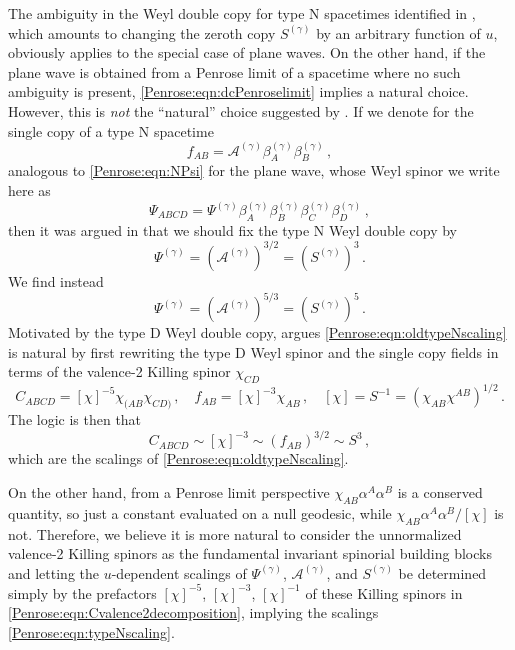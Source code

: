 The ambiguity in the Weyl double copy for type N spacetimes identified in \cite{Luna:2018dpt}, which amounts to changing the zeroth copy $S^{(\gamma)}$ by an arbitrary function of $u$, obviously applies to the special case of plane waves. On the other hand, if the plane wave is obtained from a Penrose limit of a spacetime where no such ambiguity is present, \eqref{Penrose:eqn:dcPenroselimit} implies a natural choice. However, this is \emph{not} the ``natural'' choice suggested by \cite{Luna:2018dpt}. If we denote for the single copy of a type N spacetime
\begin{equation}
	f_{AB} = \mathcal{A}^{(\gamma)}\beta^{(\gamma)}_A \beta^{(\gamma)}_B \, ,
\end{equation}
analogous to \eqref{Penrose:eqn:NPsi} for the plane wave, whose Weyl spinor we write here as
\begin{equation}
\Psi_{ABCD} = \Psi^{(\gamma)}  \beta^{(\gamma)}_A \beta^{(\gamma)}_B \beta^{(\gamma)}_C \beta^{(\gamma)}_D \, ,
\end{equation}
then  it was argued in \cite{Luna:2018dpt} that we should fix the type N Weyl double copy by
\begin{equation}\label{Penrose:eqn:oldtypeNscaling}
\Psi^{(\gamma)} = \left(\mathcal{A}^{(\gamma)}\right)^{3/2} = (S^{(\gamma)})^3 \, .
\end{equation}
We find instead
\begin{equation}\label{Penrose:eqn:typeNscaling}
\Psi^{(\gamma)} = \left(\mathcal{A}^{(\gamma)}\right)^{5/3} = (S^{(\gamma)})^5 \, .
\end{equation}
Motivated by the type D Weyl double copy, \cite{Luna:2018dpt} argues \eqref{Penrose:eqn:oldtypeNscaling} is natural by first rewriting the type D Weyl spinor and the single copy fields in terms of the valence-2 Killing spinor $\chi_{CD}$ 
\begin{equation}\label{Penrose:eqn:Cvalence2decomposition}
C_{ABCD} = [\chi]^{-5} \chi_{(AB} \chi_{CD)} \, , \quad  f_{AB} = [\chi]^{-3}  \chi_{AB} \, ,\quad [\chi] = S^{-1} = (\chi_{AB}\chi^{AB})^{1/2} \, .
\end{equation}
The logic is then that
\begin{equation}
C_{ABCD} \sim [\chi]^{-3} \sim  (f_{AB})^{3/2} \sim S^3 \, ,
\end{equation}
which are the scalings of \eqref{Penrose:eqn:oldtypeNscaling}.

On the other hand, from a Penrose limit perspective $\chi_{AB}\alpha^A \alpha^B$ is a conserved quantity, so just a constant evaluated on a null geodesic, while $\chi_{AB}\alpha^A \alpha^B/[\chi]$ is not. Therefore, we believe it is more natural to consider the unnormalized valence-2 Killing spinors as the fundamental invariant spinorial building blocks and letting the $u$-dependent scalings of $\Psi^{(\gamma)}$, $\mathcal{A}^{(\gamma)}$, and $S^{(\gamma)}$ be determined simply by the prefactors $[\chi]^{-5}$, $[\chi]^{-3}$, $[\chi]^{-1}$ of these Killing spinors in \eqref{Penrose:eqn:Cvalence2decomposition}, implying the scalings \eqref{Penrose:eqn:typeNscaling}. 

